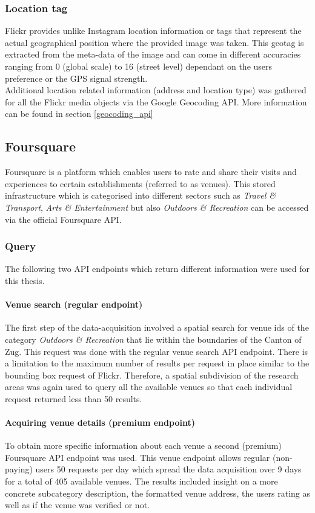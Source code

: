 \subsubsection*{Location tag} \label{flickr_location_tag}
Flickr provides unlike Instagram location information or tags that represent the actual geographical position where the provided image was taken. This geotag is extracted from the meta-data of the image and can come in different accuracies ranging from 0 (global scale) to 16 (street level) dependant on the users preference or the GPS signal strength. \\
Additional location related information (address and location type) was gathered for all the Flickr media objects via the Google Geocoding API. More information can be found in section \ref{geocoding_api}

\subsection{Foursquare} \label{foursquare}
Foursquare is a platform which enables users to rate and share their visits and experiences to certain establishments (referred to as venues). This stored infrastructure which is categorised into different sectors such as \textit{Travel \& Transport}, \textit{Arts \& Entertainment} but also \textit{Outdoors \& Recreation} can be accessed via the official Foursquare API.

\subsubsection*{Query} \label{foursquare_query}
The following two API endpoints which return different information were used for this thesis.
\paragraph*{Venue search (regular endpoint)} \label{foursquare_endpoint1}
The first step of the data-acquisition involved a spatial search for venue ids of the category \textit{Outdoors \& Recreation} that lie within the boundaries of the Canton of Zug. This request was done with the regular venue search API endpoint. There is a limitation to the maximum number of results per request in place similar to the bounding box request of Flickr. Therefore, a spatial subdivision of the research areas was again used to query all the available venues so that each individual request returned less than 50 results.
\paragraph*{Acquiring venue details (premium endpoint)} \label{foursquare_endpoint2}
To obtain more specific information about each venue a second (premium) Foursquare API endpoint was used. This venue endpoint allows regular (non-paying) users 50 requests per day which spread the data acquisition over 9 days for a total of 405 available venues. The results included insight on a more concrete subcategory description, the formatted venue address, the users rating as well as if the venue was verified or not.

